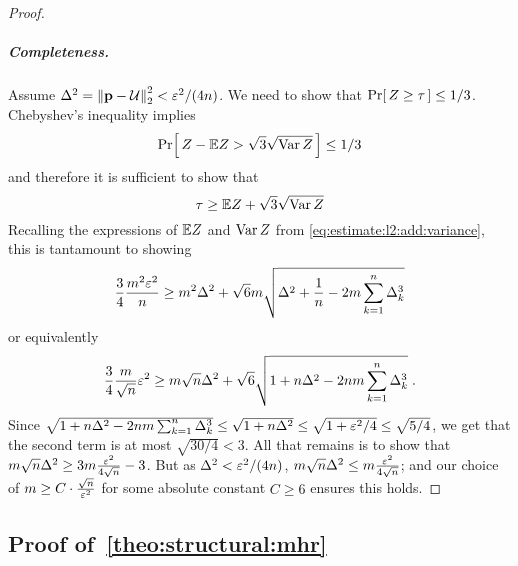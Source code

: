 \begin{proof}
\subparagraph{Completeness.} Assume $\Delta^2={\lVert\mathbf{p}-\mathcal{U}{\rVert}}_2^2 < \varepsilon^2/(4n)$. We need to show that $\Pr\!\left[\,  Z \geq \tau \, \right] \leq 1/3$. Chebyshev's inequality implies
\[
    \Pr\!\left[\,  Z - \mathbb{E} Z > \sqrt{3}\sqrt{\operatorname{Var} Z} \, \right] \leq 1/3
\]
and therefore it is sufficient to show that 
\[
    \tau \geq \mathbb{E} Z + \sqrt{3}\sqrt{\operatorname{Var} Z}
\]
Recalling the expressions of $\mathbb{E} Z$ and $\operatorname{Var} Z$ from \eqref{eq:estimate:l2:add:variance}, this is tantamount to showing
\[
    \frac{3}{4}\frac{m^2\varepsilon^2}{n} \geq m^2\Delta^2 + \sqrt{6}m\sqrt{\Delta^2 + \frac{1}{n} -2m \sum_{k=1}^n \Delta_k^3}
\]
or equivalently
\[
    \frac{3}{4} \frac{m}{\sqrt{n}}\varepsilon^2 \geq m \sqrt{n} \Delta^2 + \sqrt{6} \sqrt{1 + n\Delta^2 -2nm \sum_{k=1}^n \Delta_k^3}\;.
\]
Since $\sqrt{1 + n\Delta^2 -2 n m  \sum_{k=1}^n \Delta_k^3} \leq \sqrt{1 + n\Delta^2} \leq \sqrt{1 + \varepsilon^2/4} \leq \sqrt{5/4}$, we get that the second term is at most $\sqrt{30/4} < 3$. All that remains is to show that $m\sqrt{n}\Delta^2 \geq 3m\frac{\varepsilon^2}{4\sqrt{n}}-3$. But as $\Delta^2 < \varepsilon^2/(4n)$, $m\sqrt{n}\Delta^2 \leq m\frac{\varepsilon^2}{4\sqrt{n}}$; and our choice of $m \geq C\cdot\frac{\sqrt{n}}{\varepsilon^2}$ for some absolute constant $C \geq 6$  ensures this holds.
\end{proof}
 
\subsection{Proof of~\cref{theo:structural:mhr}}\label{app:structural:proofs}

